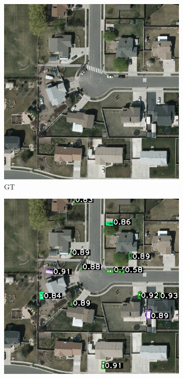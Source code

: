 \begin{figure}[h] 
    \centering
    \begin{subfigure}[b]{0.45\textwidth} %
        \includegraphics[width=\textwidth]{images/015Results/wrong_labels/comp_images/00000034_co.png} %
        \caption{\Acrlong{GT} } %
        \label{fig:cm_trgbir} %
    \end{subfigure}
    \hfill %
    \begin{subfigure}[b]{0.45\textwidth} %
        \includegraphics[width=\textwidth]{images/015Results/wrong_labels/comp_images/rgbir/34.png} %

\end{subfigure}
\end{figure}
